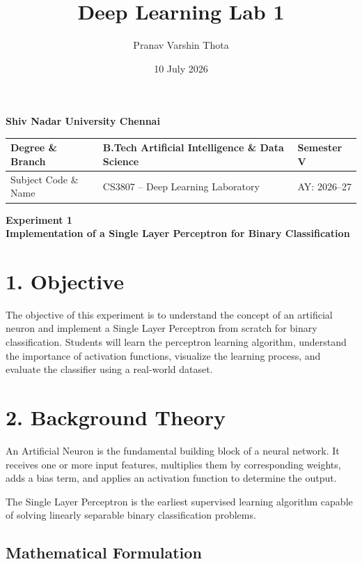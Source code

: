 \documentclass{article}
\title{Deep Learning Lab 1}
\author{Pranav Varshin Thota}
\date{10 July 2026}
\begin{document}
\begin{center}
\Large\textbf{Shiv Nadar University Chennai}
\end{center}

\renewcommand{\arraystretch}{1.4}

\begin{tabular}{|p{3.5cm}|p{8cm}|p{2cm}|}
\hline
Degree \& Branch & B.Tech Artificial Intelligence \& Data Science & Semester V\\ \hline
Subject Code \& Name & CS3807 -- Deep Learning Laboratory & AY: 2026--27\\ \hline
\end{tabular}

\vspace{3mm}

\begin{center}
\Large\textbf{Experiment 1}\\
\large\textbf{Implementation of a Single Layer Perceptron for Binary Classification}
\end{center}

\section*{1. Objective}

The objective of this experiment is to understand the concept of an artificial neuron and implement a Single Layer Perceptron from scratch for binary classification. Students will learn the perceptron learning algorithm, understand the importance of activation functions, visualize the learning process, and evaluate the classifier using a real-world dataset.


\section*{2. Background Theory}

An Artificial Neuron is the fundamental building block of a neural network. It receives one or more input features, multiplies them by corresponding weights, adds a bias term, and applies an activation function to determine the output.

The Single Layer Perceptron is the earliest supervised learning algorithm capable of solving linearly separable binary classification problems.

\subsection*{Mathematical Formulation}
\end{document}
